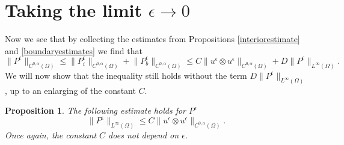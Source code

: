 \documentclass[12pt,a4paper]{article}
\newtheorem{proposition}[theorem]{Proposition}
\theoremstyle{definition}
\theoremstyle{remark}
\numberwithin{equation}{section}
\begin{document}
\section{Taking the limit $\epsilon \rightarrow 0$} \label{limitsection}
Now we see that by collecting the estimates from Propositions \ref{interiorestimate} and \ref{boundaryestimates} we find that
\begin{equation} \label{collectedestimates}
\lVert P^\epsilon \rVert_{C^{0, \alpha } (\Omega) } \leq \lVert P^\epsilon_i \rVert_{C^{0, \alpha } (\Omega) } + \lVert P^\epsilon_{b} \rVert_{C^{0, \alpha } (\Omega) } \leq C \lVert u^\epsilon \otimes u^\epsilon \rVert_{C^{0, \alpha} (\Omega) } + D \lVert P^\epsilon \rVert_{L^\infty (\Omega)}.
\end{equation}
We will now show that the inequality still holds without the term $D \lVert P^\epsilon \rVert_{L^\infty (\Omega)}$, up to an enlarging of the constant $C$.
\begin{proposition} \label{pressurebound}
The following estimate holds for $P^\epsilon$
\begin{equation} \label{mollificationlimit}
\lVert P^\epsilon \rVert_{L^\infty (\Omega)} \leq C \lVert u^\epsilon \otimes u^\epsilon \rVert_{C^{0, \alpha} (\Omega)}. 
\end{equation}
Once again, the constant $C$ does not depend on $\epsilon$.
\end{proposition}
\end{document}
